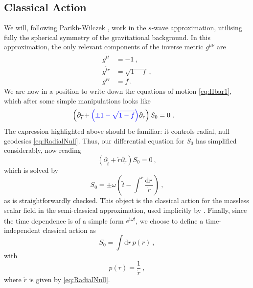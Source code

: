 \documentclass[a4paper,11pt]{article}
\newcommand{\ii}{\text{i}}
\newcommand{\dd}[1]{\text{d}#1 \, }
\begin{document}
\subsection{Classical Action}
We will, following Parikh-Wilczek \cite{Parikh:1999mf}, work in the $s$-wave approximation, utilising fully the spherical symmetry of the gravitational background. In this approximation, the only relevant components of the inverse metric $g^{\mu\nu}$ are
\begin{align}
g^{\widetilde{t}\widetilde{t}} &= -1 \ , \\
g^{\widetilde{t} r} &= \sqrt{1-f} \ , \\
g^{rr} &= f \ .
\end{align}
We are now in a position to write down the equations of motion \eqref{eq:Hbar1}, which after some simple manipulations looks like
\begin{align}
\left( \partial_{\widetilde{t}} + \textcolor{blue}{\left( \pm 1 - \sqrt{1-f} \right)} \partial_r \right) S_0 &= 0 \ .
\end{align}
The expression highlighted above should be familiar: it controls radial, null geodesics \eqref{eq:RadialNull}. Thus, our differential equation for $S_0$ has simplified considerably, now reading
\begin{equation}
 \left( \partial_{\widetilde{t}} + \dot{r} \partial_r \right) S_0 = 0 \ ,
\end{equation}
which is solved by 
\begin{equation}
S_0 = \pm \omega \left(\widetilde{t} - \int^r \frac{\dd{r}}{\dot{r}} \right) \ ,
\end{equation}
as is straightforwardly checked. This object is the classical action for the massless scalar field in the semi-classical approximation, used implicitly by \cite{Parikh:1999mf}. Finally, since the time dependence is of a simple form $e^{\ii \omega \widetilde{t}}$, we choose to define a time-independent classical action as
\begin{equation}
\label{eq:S0Momentum}
S_0 = \int \dd{r} p(r) \ ,
\end{equation}
with 
\begin{equation}
p(r) = \frac{1}{\dot{r}} \ ,
\end{equation}
where $\dot{r}$ is given by \eqref{eq:RadialNull}.
\end{document}
